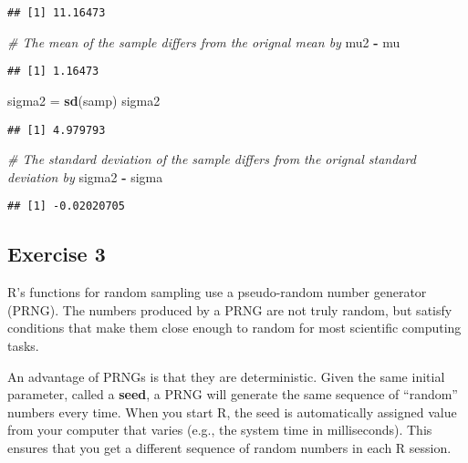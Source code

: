 \documentclass[
]{article}
\newenvironment{Shaded}{\begin{snugshade}}{\end{snugshade}}
\newcommand{\CommentTok}[1]{\textcolor[rgb]{0.56,0.35,0.01}{\textit{#1}}}
\newcommand{\KeywordTok}[1]{\textcolor[rgb]{0.13,0.29,0.53}{\textbf{#1}}}
\newcommand{\NormalTok}[1]{#1}
\newcommand{\OperatorTok}[1]{\textcolor[rgb]{0.81,0.36,0.00}{\textbf{#1}}}
\newcommand{\StringTok}[1]{\textcolor[rgb]{0.31,0.60,0.02}{#1}}
\begin{document}
\begin{verbatim}
## [1] 11.16473
\end{verbatim}

\begin{Shaded}
\begin{Highlighting}[]
\CommentTok{\# The mean of the sample differs from the orignal mean by}
\NormalTok{mu2 }\OperatorTok{{-}}\StringTok{ }\NormalTok{mu}
\end{Highlighting}
\end{Shaded}

\begin{verbatim}
## [1] 1.16473
\end{verbatim}

\begin{Shaded}
\begin{Highlighting}[]
\NormalTok{sigma2 =}\StringTok{ }\KeywordTok{sd}\NormalTok{(samp)}
\NormalTok{sigma2}
\end{Highlighting}
\end{Shaded}

\begin{verbatim}
## [1] 4.979793
\end{verbatim}

\begin{Shaded}
\begin{Highlighting}[]
\CommentTok{\# The standard deviation of the sample differs from the orignal standard deviation by}
\NormalTok{sigma2 }\OperatorTok{{-}}\StringTok{ }\NormalTok{sigma}
\end{Highlighting}
\end{Shaded}

\begin{verbatim}
## [1] -0.02020705
\end{verbatim}

\hypertarget{exercise-3}{%
\subsection{Exercise 3}\label{exercise-3}}

R's functions for random sampling use a pseudo-random number generator
(PRNG). The numbers produced by a PRNG are not truly random, but satisfy
conditions that make them close enough to random for most scientific
computing tasks.

An advantage of PRNGs is that they are deterministic. Given the same
initial parameter, called a \textbf{seed}, a PRNG will generate the same
sequence of ``random'' numbers every time. When you start R, the seed is
automatically assigned value from your computer that varies (e.g., the
system time in milliseconds). This ensures that you get a different
sequence of random numbers in each R session.
\end{document}
